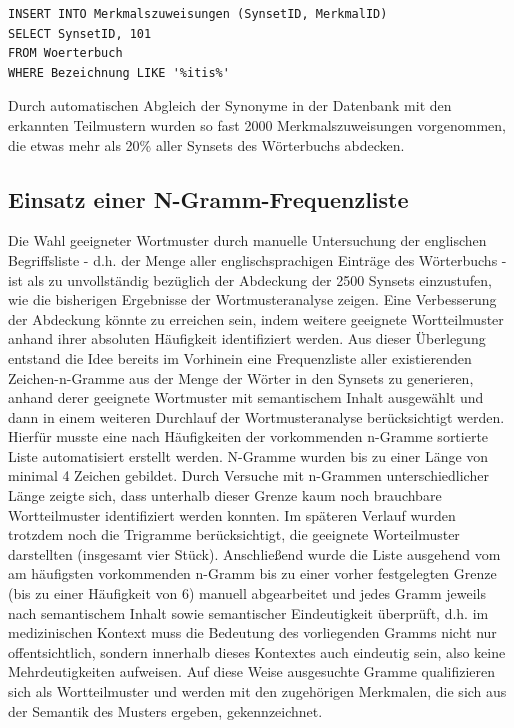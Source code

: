 \documentclass[pagesize,DIV=calc,12pt,draft]{scrreprt}
\begin{document}
\begin{lstlisting}
INSERT INTO Merkmalszuweisungen (SynsetID, MerkmalID) 
SELECT SynsetID, 101 
FROM Woerterbuch 
WHERE Bezeichnung LIKE '%itis%'
\end{lstlisting}

Durch automatischen Abgleich der Synonyme in der Datenbank mit den erkannten Teilmustern wurden so fast 2000 Merkmalszuweisungen vorgenommen, die etwas mehr als 20\% aller Synsets des Wörterbuchs abdecken. 

\subsection{Einsatz einer N-Gramm-Frequenzliste}

Die Wahl geeigneter Wortmuster durch manuelle Untersuchung der englischen Begriffsliste - d.h. 
der Menge aller englischsprachigen Einträge des Wörterbuchs - ist als zu unvollständig bezüglich der Abdeckung der 2500 Synsets einzustufen, wie die bisherigen Ergebnisse der Wortmusteranalyse zeigen. 
Eine Verbesserung der Abdeckung könnte zu erreichen sein, indem weitere geeignete Wortteilmuster anhand ihrer absoluten Häufigkeit identifiziert werden. 
Aus dieser Überlegung entstand die Idee bereits im Vorhinein eine Frequenzliste aller existierenden Zeichen-n-Gramme aus der Menge der Wörter in den Synsets zu generieren, anhand derer geeignete Wortmuster mit semantischem Inhalt ausgewählt und dann in einem weiteren Durchlauf der Wortmusteranalyse berücksichtigt werden. 
Hierfür musste eine nach Häufigkeiten der vorkommenden n-Gramme sortierte Liste automatisiert erstellt werden. 
N-Gramme wurden bis zu einer Länge von minimal 4 Zeichen gebildet. 
Durch Versuche mit n-Grammen unterschiedlicher Länge zeigte sich, dass unterhalb dieser Grenze kaum noch brauchbare Wortteilmuster identifiziert werden konnten. 
Im späteren Verlauf wurden trotzdem noch die Trigramme berücksichtigt, die geeignete Worteilmuster darstellten (insgesamt vier Stück). 
Anschließend wurde die Liste ausgehend vom am häufigsten vorkommenden n-Gramm bis zu einer vorher festgelegten Grenze (bis zu einer Häufigkeit von 6) manuell abgearbeitet und jedes Gramm jeweils nach semantischem Inhalt sowie semantischer Eindeutigkeit überprüft, d.h. 
im medizinischen Kontext muss die Bedeutung des vorliegenden Gramms nicht nur offentsichtlich, sondern innerhalb dieses Kontextes auch eindeutig sein, also keine Mehrdeutigkeiten aufweisen. 
Auf diese Weise ausgesuchte Gramme qualifizieren sich als Wortteilmuster und werden mit den zugehörigen Merkmalen, die sich aus der Semantik des Musters ergeben, gekennzeichnet. 
\end{document}
